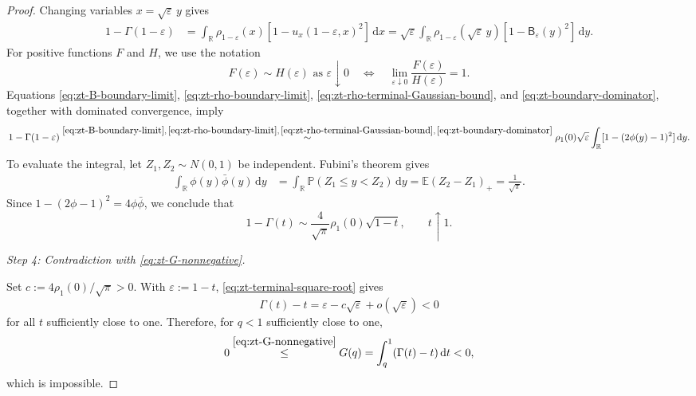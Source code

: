 \documentclass[10pt]{amsart}
\theoremstyle{definition}
\theoremstyle{remark}
\numberwithin{equation}{section}
\newcommand{\R}{\mathbb R}
\newcommand{\E}{\mathbb E}
\newcommand{\PP}{\mathbb P}
\newcommand{\1}{\mathbf 1}
\newcommand{\dd}{\,\mathrm d}
\newcommand{\stackref}[2]{\stackrel{#2}{#1}}
\begin{document}
\begin{proof}
Changing variables $x=\sqrt\varepsilon\,y$ gives
\begin{align*}
 1-\Gamma(1-\varepsilon)
 &=\int_\R\rho_{1-\varepsilon}(x)
   [1-u_x(1-\varepsilon,x)^2]\dd x =\sqrt\varepsilon\int_\R
 \rho_{1-\varepsilon}(\sqrt\varepsilon\,y)
 [1-\mathsf B_\varepsilon(y)^2]\dd y.
\end{align*}
For positive functions $F$ and $H$, we use the notation
\begin{equation*}
 F(\varepsilon)\sim H(\varepsilon)\text{ as }\varepsilon\downarrow0
 \quad\Longleftrightarrow\quad
 \lim_{\varepsilon\downarrow0}\frac{F(\varepsilon)}{H(\varepsilon)}=1.
\end{equation*}
Equations \eqref{eq:zt-B-boundary-limit}, \eqref{eq:zt-rho-boundary-limit}, \eqref{eq:zt-rho-terminal-Gaussian-bound}, and \eqref{eq:zt-boundary-dominator}, together with dominated convergence, imply
\begin{equation*}
 1-\Gamma(1-\varepsilon)
 \stackref{\sim}{\eqref{eq:zt-B-boundary-limit},\,\eqref{eq:zt-rho-boundary-limit},\,\eqref{eq:zt-rho-terminal-Gaussian-bound},\,\eqref{eq:zt-boundary-dominator}}
 \rho_1(0)\sqrt\varepsilon
 \int_\R[1-(2\phi(y)-1)^2]\dd y.
\end{equation*}
To evaluate the integral, let $Z_1,Z_2\sim N(0,1)$ be independent. Fubini's theorem gives
\begin{align*}
 \int_\R\phi(y)\bar\phi(y)\dd y
 &=\int_\R\PP(Z_1\leq y<Z_2)\dd y =\E(Z_2-Z_1)_+=\frac1{\sqrt\pi}.
\end{align*}
Since $1-(2\phi-1)^2=4\phi\bar\phi$, we conclude that
\begin{equation}
 1-\Gamma(t)\sim\frac4{\sqrt\pi}\rho_1(0)\sqrt{1-t},
 \qquad t\uparrow1.
 \label{eq:zt-terminal-square-root}
\end{equation}

\smallskip
\noindent\emph{Step 4: Contradiction with \eqref{eq:zt-G-nonnegative}.}

Set $c:=4\rho_1(0)/\sqrt\pi>0$.  With $\varepsilon:=1-t$, \eqref{eq:zt-terminal-square-root} gives
\begin{equation*}
 \Gamma(t)-t=\varepsilon-c\sqrt\varepsilon
 +o(\sqrt\varepsilon)<0
\end{equation*}
for all $t$ sufficiently close to one.  Therefore, for $q<1$ sufficiently close to one,
\begin{equation*}
 0
 \stackref{\leq}{\eqref{eq:zt-G-nonnegative}}
 G(q)=\int_q^1(\Gamma(t)-t)\dd t<0,
\end{equation*}
which is impossible.
\end{proof}
\end{document}
